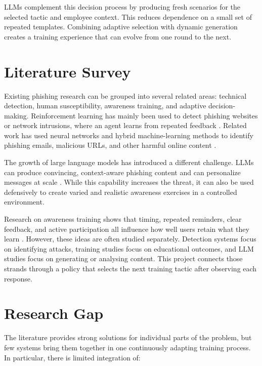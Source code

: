 \documentclass[12pt,a4paper]{article}
\begin{document}
LLMs complement this decision process by producing fresh scenarios for
the selected tactic and employee context. This reduces dependence on a
small set of repeated templates. Combining adaptive selection with
dynamic generation creates a training experience that can evolve from
one round to the next.



\section{Literature Survey}

Existing phishing research can be grouped into several related areas:
technical detection, human susceptibility, awareness training, and
adaptive decision-making. Reinforcement learning has mainly been used
to detect phishing websites or network intrusions, where an agent
learns from repeated feedback \parencite{ariyadasa2024,chatterjee2019,kheddar2024}.
Related work has used neural networks and hybrid machine-learning
methods to identify phishing emails, malicious URLs, and other harmful
online content \parencite{smadi2018,jabbar2025,patil2025}.

The growth of large language models has introduced a different
challenge. LLMs can produce convincing, context-aware phishing content
and can personalize messages at scale \parencite{bethany2026,czybik2026}.
While this capability increases the threat, it can also be used
defensively to create varied and realistic awareness exercises in a
controlled environment.

Research on awareness training shows that timing, repeated reminders,
clear feedback, and active participation all influence how well users
retain what they learn \parencite{reinheimer2020,madeira2026,wen2019}.
However, these ideas are often studied separately. Detection systems
focus on identifying attacks, training studies focus on educational
outcomes, and LLM studies focus on generating or analysing content.
This project connects those strands through a policy that selects the
next training tactic after observing each response.

\section{Research Gap}

The literature provides strong solutions for individual parts of the
problem, but few systems bring them together in one continuously
adapting training process. In particular, there is limited integration
of:
\end{document}
